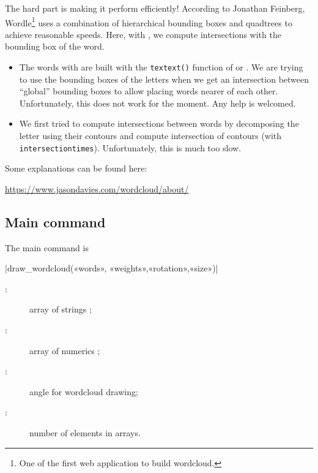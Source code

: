 \documentclass[english]{ltxdoc}
\begin{document}
The hard part is making it perform efficiently! According to Jonathan Feinberg,
Wordle\footnote{One of the first web application to build wordcloud.} uses a
combination of hierarchical bounding boxes and quadtrees to achieve reasonable
speeds. Here, with , we compute intersections with the bounding
box of the word. 

\begin{remark}
  \begin{itemize}
    \item 
  The words with  are built with the \lstinline+textext()+
  function of  or . We are trying to use the
  bounding boxes of the letters when we get an intersection between ``global''
  bounding boxes to allow placing words nearer of each other. Unfortunately,
  this does not work for the moment. Any help is welcomed. \medskip

  \item We first tried to compute intersections between words by decomposing the
  letter using their contours and compute intersection of contours (with
  \lstinline+intersectiontimes+). Unfortunately, this is much too slow. 
\end{itemize}
  
\end{remark}

Some explanations can be found here:
\begin{center}
  \url{https://www.jasondavies.com/wordcloud/about/}
\end{center}

\subsection{Main command}

The main command is 

\commande|draw_wordcloud(«words», «weights»,«rotation»,«size»)|\smallskip{}

\begin{description}
\item[:] array of strings ;
\item[:] array of numerics ;
\item[:] angle for wordcloud drawing;
\item[:] number of elements in arrays.   
\end{description}
\end{document}
